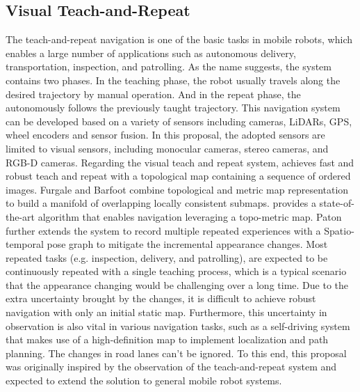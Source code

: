 \subsection{Visual Teach-and-Repeat}
The teach-and-repeat navigation\cite{paul2010vtr,mcmanus2012visual} is one of the basic tasks in mobile robots, which enables a large number of applications such as autonomous delivery, transportation, inspection, and patrolling. As the name suggests, the system contains two phases. In the teaching phase, the robot usually travels along the desired trajectory by manual operation. And in the repeat phase, the autonomously follows the previously taught trajectory. This navigation system can be developed based on a variety of sensors including cameras\cite{paul2010vtr,mcmanus2012visual,dall2021fast,clement2017robust}, LiDARs\cite{sprunk2013lidar}, GPS\cite{li1998robot}, wheel encoders\cite{krajnik2018navigation} and sensor fusion\cite{nitsche2020visual}. In this proposal, the adopted sensors are limited to visual sensors, including monocular cameras, stereo cameras, and RGB-D cameras. Regarding the visual teach and repeat system, \cite{dall2021fast} achieves fast and robust teach and repeat with a topological map containing a sequence of ordered images. Furgale and Barfoot\cite{paul2010vtr} combine topological and metric map representation to build a manifold of overlapping locally consistent submaps. 
provides a state-of-the-art algorithm that enables navigation leveraging a topo-metric map. Paton\cite{paton2016bridging} further extends the system to record multiple repeated experiences with a Spatio-temporal pose graph to mitigate the incremental appearance changes. Most repeated tasks (e.g. inspection, delivery, and patrolling), are expected to be continuously repeated with a single teaching process, which is a typical scenario that the appearance changing would be challenging over a long time\cite{qian2022pocd}. Due to the extra uncertainty brought by the changes, it is difficult to achieve robust navigation with only an initial static map. Furthermore, this uncertainty in observation is also vital in various navigation tasks, such as a self-driving system that makes use of a high-definition map to implement localization and path planning. The changes in road lanes can't be ignored. To this end, this proposal was originally inspired by the observation of the teach-and-repeat system and expected to extend the solution to general mobile robot systems. 
